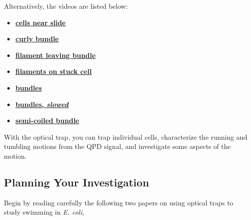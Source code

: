 \documentclass{../lab}
\begin{document}
Alternatively, the videos are listed below:

\begin{itemize}
        \item \href{http://experimentationlab.berkeley.edu/sites/default/files/cellsnearslide.mov}{\textbf{cells near slide}}

        \item \href{http://experimentationlab.berkeley.edu/sites/default/files/curlybundle.mov}{\textbf{curly bundle}}

        \item \href{http://experimentationlab.berkeley.edu/sites/default/files/filamentleavingbundle.mov}{\textbf{filament leaving bundle}}
        
        \item \href{http://experimentationlab.berkeley.edu/sites/default/files/filamentsonstuckcell.mov}{\textbf{filaments on stuck cell}}
        
        \item \href{http://experimentationlab.berkeley.edu/sites/default/files/fluorescentbundles.mov}{\textbf{bundles}}

        \item \href{http://experimentationlab.berkeley.edu/sites/default/files/fluorescentbundlesslow.mov}{\textbf{bundles, \emph{slowed}}}

        \item \href{http://experimentationlab.berkeley.edu/sites/default/files/semicoiledbundle.mov}{\textbf{semi-coiled bundle}}

\end{itemize}

With the optical trap, you can trap individual cells, characterize the running and tumbling motions from the QPD signal, and investigate some aspects of the motion.

\subsection{Planning Your Investigation}

Begin by reading carefully the following two papers on using optical traps to study swimming in \emph{E. coli},
\end{document}
